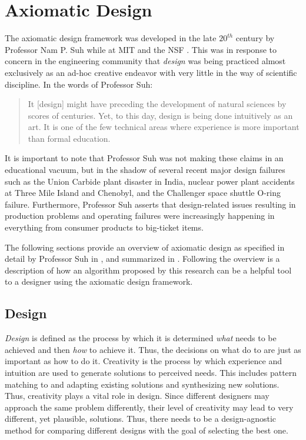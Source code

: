 \section{Axiomatic Design}\label{sec:design}

The axiomatic design framework was developed in the late \(20^{th}\) century by Professor Nam P. Suh while at MIT
and the NSF \cite{suh}.  This was in response to concern in the engineering community that \emph{design} was being
practiced almost exclusively as an ad-hoc creative endeavor with very little in the way of scientific discipline.
In the words of Professor Suh:
\begin{quote}
  It [design] might have preceding the development of natural sciences by scores of centuries.  Yet, to this day,
  design is being done intuitively as an art.  It is one of the few technical areas where experience is more
  important than formal education.
\end{quote}
It is important to note that Professor Suh was not making these claims in an educational vacuum, but in the shadow
of several recent major design failures such as the Union Carbide plant disaster in India, nuclear power plant
accidents at Three Mile Island and Chenobyl, and the Challenger space shuttle O-ring failure.  Furthermore,
Professor Suh asserts that design-related issues resulting in production problems and operating failures were
increasingly happening in everything from consumer products to big-ticket items.

The following sections provide an overview of axiomatic design as specified in detail by Professor Suh in
\cite{suh}, and summarized in \cite{cavallaro,jahanbekam,suh2}.  Following the overview is a description of how an
algorithm proposed by this research can be a helpful tool to a designer using the axiomatic design framework.

\subsection{Design}

\emph{Design} is defined as the process by which it is determined \emph{what} needs to be achieved and then
\emph{how} to achieve it.  Thus, the decisions on what do to are just as important as how to do it.  Creativity is
the process by which experience and intuition are used to generate solutions to perceived needs.  This includes
pattern matching to and adapting existing solutions and synthesizing new solutions.  Thus, creativity plays a vital
role in design.  Since different designers may approach the same problem differently, their level of creativity may
lead to very different, yet plausible, solutions.  Thus, there needs to be a design-agnostic method for comparing
different designs with the goal of selecting the best one.

